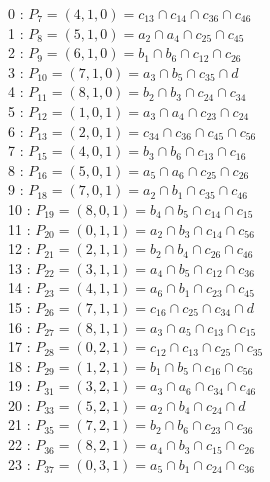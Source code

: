 0 : $P_{7}=( 4, 1, 0 ) = c_{13} \cap c_{14} \cap c_{36} \cap c_{46}$\\
1 : $P_{8}=( 5, 1, 0 ) = a_{2} \cap a_{4} \cap c_{25} \cap c_{45}$\\
2 : $P_{9}=( 6, 1, 0 ) = b_{1} \cap b_{6} \cap c_{12} \cap c_{26}$\\
3 : $P_{10}=( 7, 1, 0 ) = a_{3} \cap b_{5} \cap c_{35} \cap d$\\
4 : $P_{11}=( 8, 1, 0 ) = b_{2} \cap b_{3} \cap c_{24} \cap c_{34}$\\
5 : $P_{12}=( 1, 0, 1 ) = a_{3} \cap a_{4} \cap c_{23} \cap c_{24}$\\
6 : $P_{13}=( 2, 0, 1 ) = c_{34} \cap c_{36} \cap c_{45} \cap c_{56}$\\
7 : $P_{15}=( 4, 0, 1 ) = b_{3} \cap b_{6} \cap c_{13} \cap c_{16}$\\
8 : $P_{16}=( 5, 0, 1 ) = a_{5} \cap a_{6} \cap c_{25} \cap c_{26}$\\
9 : $P_{18}=( 7, 0, 1 ) = a_{2} \cap b_{1} \cap c_{35} \cap c_{46}$\\
10 : $P_{19}=( 8, 0, 1 ) = b_{4} \cap b_{5} \cap c_{14} \cap c_{15}$\\
11 : $P_{20}=( 0, 1, 1 ) = a_{2} \cap b_{3} \cap c_{14} \cap c_{56}$\\
12 : $P_{21}=( 2, 1, 1 ) = b_{2} \cap b_{4} \cap c_{26} \cap c_{46}$\\
13 : $P_{22}=( 3, 1, 1 ) = a_{4} \cap b_{5} \cap c_{12} \cap c_{36}$\\
14 : $P_{23}=( 4, 1, 1 ) = a_{6} \cap b_{1} \cap c_{23} \cap c_{45}$\\
15 : $P_{26}=( 7, 1, 1 ) = c_{16} \cap c_{25} \cap c_{34} \cap d$\\
16 : $P_{27}=( 8, 1, 1 ) = a_{3} \cap a_{5} \cap c_{13} \cap c_{15}$\\
17 : $P_{28}=( 0, 2, 1 ) = c_{12} \cap c_{13} \cap c_{25} \cap c_{35}$\\
18 : $P_{29}=( 1, 2, 1 ) = b_{1} \cap b_{5} \cap c_{16} \cap c_{56}$\\
19 : $P_{31}=( 3, 2, 1 ) = a_{3} \cap a_{6} \cap c_{34} \cap c_{46}$\\
20 : $P_{33}=( 5, 2, 1 ) = a_{2} \cap b_{4} \cap c_{24} \cap d$\\
21 : $P_{35}=( 7, 2, 1 ) = b_{2} \cap b_{6} \cap c_{23} \cap c_{36}$\\
22 : $P_{36}=( 8, 2, 1 ) = a_{4} \cap b_{3} \cap c_{15} \cap c_{26}$\\
23 : $P_{37}=( 0, 3, 1 ) = a_{5} \cap b_{1} \cap c_{24} \cap c_{36}$\\
